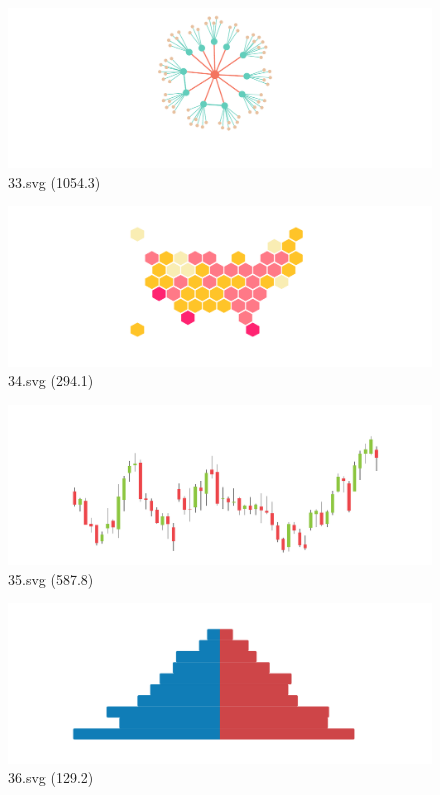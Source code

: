 \documentclass[journal]{IEEEtran}
\begin{document}
\begin{figure}[!htbp]
\centering
\begin{minipage}{0.233\columnwidth}
\centering
\includegraphics[width=\textwidth]{Train_set/33.pdf}
{33.svg (1054.3)}
\end{minipage}
\hfill
\begin{minipage}{0.233\columnwidth}
\centering
\includegraphics[width=\textwidth]{Train_set/34.pdf}
{34.svg (294.1)}
\end{minipage}
\hfill
\begin{minipage}{0.233\columnwidth}
\centering
\includegraphics[width=\textwidth]{Train_set/35.pdf}
{35.svg (587.8)}
\end{minipage}
\hfill
\begin{minipage}{0.233\columnwidth}
\centering
\includegraphics[width=\textwidth]{Train_set/36.pdf}
{36.svg (129.2)}
\end{minipage}
\end{figure}
\end{document}
